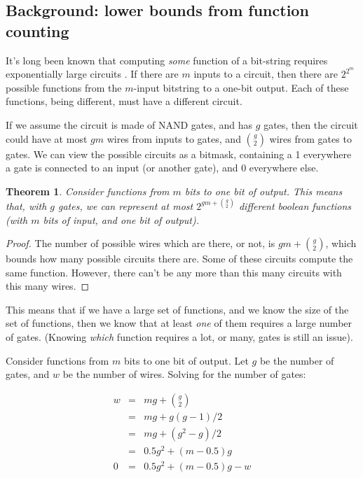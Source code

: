 \documentclass[12pt]{article}
\newtheorem{thm}{Theorem}[section]
\theoremstyle{definition}
\begin{document}
\subsection{Background: lower bounds from function counting}

It's long been known that computing {\em some} function of a bit-string
requires exponentially large circuits \cite{shannon_synthesis_1949}.
If there are $m$ inputs to a circuit,
then there are $2^{2^m}$ possible functions from the $m$-input bitstring to
a one-bit output. Each of these functions, being different, must have a
different circuit.

If we assume the circuit is made of NAND gates, and has $g$ gates, then the
circuit could have at most $gm$ wires from inputs to gates, and ${g \choose 2}$
wires from gates to gates. We can view the possible circuits as a bitmask,
containing a 1 everywhere a gate is connected to an input (or another gate),
and 0 everywhere else.

\begin{thm}
\label{boundFromCounting}
Consider functions from $m$ bits to one bit of output.
This means that, with $g$ gates, we can represent at most
$2^{gm + {g \choose 2}}$ different boolean functions (with $m$ bits of input,
and one bit of output).
\end{thm}
\begin{proof}

The number of possible wires which are there, or not, is $gm + {g \choose 2}$,
which bounds how many possible circuits there are.
Some of these circuits compute the same function.
However, there can't be any more than this many circuits with this many wires.
\end{proof}

This means that if we have a large set of functions, and we know the size of
the set of functions, then we know that at least {\em one} of them requires
a large number of gates. (Knowing {\em which} function requires a lot, or many,
gates is still an issue).

Consider functions from $m$ bits to one bit of output.
Let $g$ be the number of gates, and $w$ be the number of wires.
Solving for the number of gates:

\begin{eqnarray*}
w & = & mg + {g \choose 2} \\
  & = & mg + g(g-1)/2 \\
  & = & mg + (g^2 - g) / 2 \\
  & = & 0.5g^2 + (m-0.5)g \\
0 & = & 0.5g^2 + (m-0.5)g - w \\
\end{eqnarray*}
\end{document}
